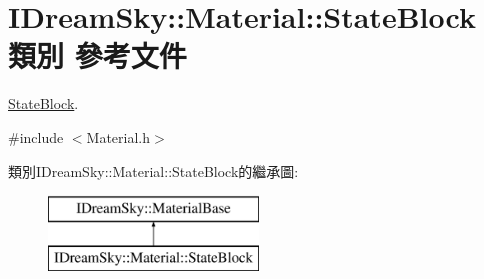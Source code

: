 \hypertarget{class_i_dream_sky_1_1_material_1_1_state_block}{}\section{I\+Dream\+Sky\+:\+:Material\+:\+:State\+Block 類別 參考文件}
\label{class_i_dream_sky_1_1_material_1_1_state_block}


\hyperlink{class_i_dream_sky_1_1_material_1_1_state_block}{State\+Block}.  




{\ttfamily \#include $<$Material.\+h$>$}

類別\+I\+Dream\+Sky\+:\+:Material\+:\+:State\+Block的繼承圖\+:\begin{figure}[H]
\begin{center}
\leavevmode
\includegraphics[height=2.000000cm]{class_i_dream_sky_1_1_material_1_1_state_block}
\end{center}
\end{figure}
